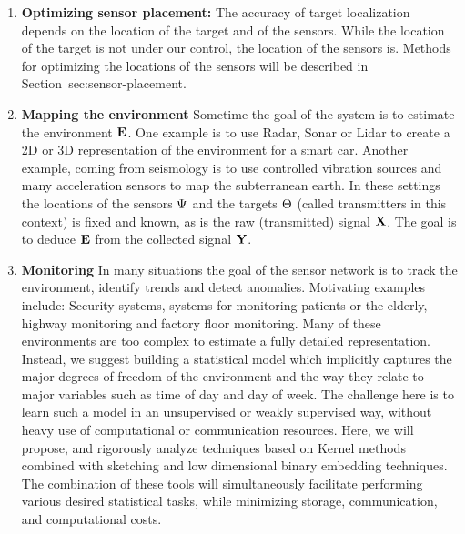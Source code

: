 \begin{enumerate}
    \item {\bf Optimizing sensor placement:} The accuracy of target
      localization depends on the location of the target and of the
      sensors. While the location of the target is not under our
      control, the location of the sensors is. Methods for optimizing
      the locations of the sensors will be described in
      Section~{sec:sensor-placement.}
    
    \item{\bf Mapping the environment} Sometime the goal of the system
      is to estimate the environment $\mathbf{E}$. One example is to use
      Radar, Sonar or Lidar to create a 2D or 3D representation of the
      environment for a smart car. Another example, coming from
      seismology is to use controlled vibration sources and many
      acceleration sensors to map the subterranean earth. In these
      settings the locations of the sensors $\Psi$ and the targets
      $\Theta$ (called transmitters in this context) is fixed and
      known, as is the raw (transmitted) signal $\mathbf{X}$. The goal
      is to deduce $\mathbf{E}$ from the collected signal
      $\mathbf{Y}$. 
    
    \item {\bf Monitoring} \label{item:monitoring} In many situations the goal of the sensor
      network is to track the environment, identify trends and detect
      anomalies. Motivating examples include: Security systems,
      systems for monitoring patients or the elderly, highway
      monitoring and factory floor monitoring. Many of these
      environments are too complex to estimate a fully detailed
      representation. Instead, we suggest building a statistical model
      which implicitly captures the major degrees of freedom of the
      environment and the way they relate to major variables such as
      time of day and day of week.  The challenge here is to learn
      such a model in an unsupervised or weakly supervised way,
      without heavy use of computational or communication
      resources. Here, we will propose, and rigorously analyze
      techniques based on Kernel methods combined with sketching and
      low dimensional binary embedding techniques. The combination of
      these tools will simultaneously facilitate performing various
      desired statistical tasks, while minimizing storage,
      communication, and computational costs.
    
\end{enumerate}

